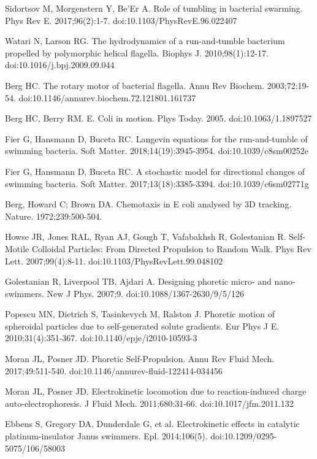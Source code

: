 \documentclass[11pt]{article}
\begin{document}
\begin{thebibliography}{9}
Sidortsov M, Morgenstern Y, Be’Er A. Role of tumbling in bacterial swarming. Phys Rev E. 2017;96(2):1-7. doi:10.1103/PhysRevE.96.022407

Watari N, Larson RG. The hydrodynamics of a run-and-tumble bacterium propelled by polymorphic helical flagella. Biophys J. 2010;98(1):12-17. doi:10.1016/j.bpj.2009.09.044

Berg HC. The rotary motor of bacterial flagella. Annu Rev Biochem. 2003;72:19-54. doi:10.1146/annurev.biochem.72.121801.161737

Berg HC, Berry RM. E. Coli in motion. Phys Today. 2005. doi:10.1063/1.1897527

Fier G, Hansmann D, Buceta RC. Langevin equations for the run-and-tumble of swimming bacteria. Soft Matter. 2018;14(19):3945-3954. doi:10.1039/c8sm00252e

Fier G, Hansmann D, Buceta RC. A stochastic model for directional changes of swimming bacteria. Soft Matter. 2017;13(18):3385-3394. doi:10.1039/c6sm02771g

Berg, Howard C; Brown DA. Chemotaxis in E coli analysed by 3D tracking. Nature. 1972;239:500-504.

Howse JR, Jones RAL, Ryan AJ, Gough T, Vafabakhsh R, Golestanian R. Self-Motile Colloidal Particles: From Directed Propulsion to Random Walk. Phys Rev Lett. 2007;99(4):8-11. doi:10.1103/PhysRevLett.99.048102

Golestanian R, Liverpool TB, Ajdari A. Designing phoretic micro- and nano-swimmers. New J Phys. 2007;9. doi:10.1088/1367-2630/9/5/126

Popescu MN, Dietrich S, Tasinkevych M, Ralston J. Phoretic motion of spheroidal particles due to self-generated solute gradients. Eur Phys J E. 2010;31(4):351-367. doi:10.1140/epje/i2010-10593-3

Moran JL, Posner JD. Phoretic Self-Propulsion. Annu Rev Fluid Mech. 2017;49:511-540. doi:10.1146/annurev-fluid-122414-034456

Moran JL, Posner JD. Electrokinetic locomotion due to reaction-induced charge auto-electrophoresis. J Fluid Mech. 2011;680:31-66. doi:10.1017/jfm.2011.132

Ebbens S, Gregory DA, Dunderdale G, et al. Electrokinetic effects in catalytic platinum-insulator Janus swimmers. Epl. 2014;106(5). doi:10.1209/0295-5075/106/58003


\end{thebibliography}
\end{document}
